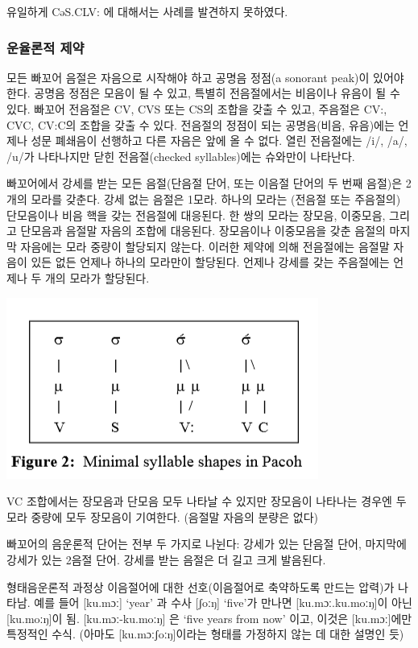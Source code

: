 유일하게 CəS.CLV: 에 대해서는 사례를 발견하지 못하였다.

\subsubsection{운율론적 제약}
모든 빠꼬어 음절은 자음으로 시작해야 하고 공명음 정점(a sonorant peak)이 있어야 한다. 공명음 정점은 모음이 될 수 있고, 특별히 전음절에서는 비음이나 유음이 될 수 있다. 빠꼬어 전음절은 CV, CVS 또는 CS의 조합을 갖출 수 있고, 주음절은 CV:, CVC, CV:C의 조합을 갖출 수 있다. 전음절의 정점이 되는 공명음(비음, 유음)에는 언제나 성문 폐쇄음이 선행하고 다른 자음은 앞에 올 수 없다. 열린 전음절에는 /i/, /a/, /u/가 나타나지만 닫힌 전음절(checked syllables)에는 슈와만이 나타난다.

빠꼬어에서 강세를 받는 모든 음절(단음절 단어, 또는 이음절 단어의 두 번째 음절)은 2개의 모라를 갖춘다. 강세 없는 음절은 1모라. 하나의 모라는 (전음절 또는 주음절의) 단모음이나 비음 핵을 갖는 전음절에 대응된다. 한 쌍의 모라는 장모음, 이중모음, 그리고 단모음과 음절말 자음의 조합에 대응된다. 장모음이나 이중모음을 갖춘 음절의 마지막 자음에는 모라 중량이 할당되지 않는다. 이러한 제약에 의해 전음절에는 음절말 자음이 있든 없든 언제나 하나의 모라만이 할당된다. 언제나 강세를 갖는 주음절에는 언제나 두 개의 모라가 할당된다.

\begin{center}
\includegraphics{Pacoh/src/PacohFigure2.png}
\end{center}

VC 조합에서는 장모음과 단모음 모두 나타날 수 있지만 장모음이 나타나는 경우엔 두 모라 중량에 모두 장모음이 기여한다. (음절말 자음의 분량은 없다)

빠꼬어의 음운론적 단어는 전부 두 가지로 나뉜다: 강세가 있는 단음절 단어, 마지막에 강세가 있는 2음절 단어. 강세를 받는 음절은 더 길고 크게 발음된다.

형태음운론적 과정상 이음절어에 대한 선호(이음절어로 축약하도록 만드는 압력)가 나타남.
예를 들어 [ku.mɔː] `year' 과 수사 [ʃoːŋ] `five'가 만나면 [ku.mɔː.ku.moːŋ]이 아닌 [ku.moːŋ]이 됨. [ku.mɔː-ku.moːŋ] 은 `five years from now' 이고, 이것은 [ku.mɔː]에만 특정적인 수식. (아마도 [ku.mɔːʃoːŋ]이라는 형태를 가정하지 않는 데 대한 설명인 듯)

